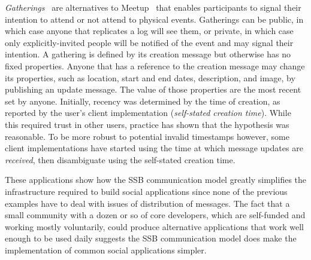 \documentclass[10pt,sigconf]{acmart}
\begin{document}
\textit{Gatherings}~\cite{patch-gatherings} are alternatives to
Meetup~\cite{meetup.com} that enables participants to signal their intention to
attend or not attend to physical events. Gatherings can be public, in which
case anyone that replicates a log will see them, or private, in which case only
explicitly-invited people will be notified of the event and may signal their
intention. A gathering is defined by its creation message but otherwise has no
fixed properties. Anyone that has a reference to the creation message may
change its properties, such as location, start and end dates, description, and
image, by publishing an update message. The value of those properties are the
most recent set by anyone. Initially, recency was determined by the time of
creation, as reported by the user's client implementation (\textit{self-stated
creation time}). While this required trust in other users, practice has shown
that the hypothesis was reasonable. To be more robust to potential invalid
timestamps however, some client implementations have started using the time at
which message updates are \textit{received}, then disambiguate using the
self-stated creation time.


These applications show how the SSB communication model greatly simplifies the
infrastructure required to build social applications since none of the previous
examples have to deal with issues of distribution of messages. The fact that a
small community with a dozen or so of core developers, which are self-funded
and working mostly voluntarily, could produce alternative applications that
work well enough to be used daily suggests the SSB communication model does
make the implementation of common social applications simpler.
\end{document}
